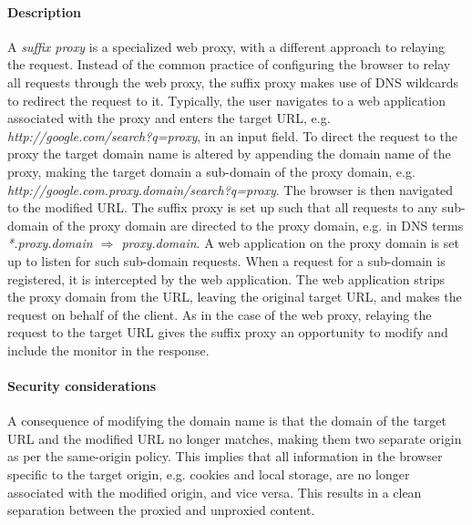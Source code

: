 \documentclass{llncs}
\begin{document}
\paragraph{Description}
A \emph{suffix proxy} is a specialized web proxy, with a different approach to relaying the request. 
Instead of the common practice of configuring the browser to relay all requests through the web proxy,
the suffix proxy makes use of DNS wildcards to redirect the request to it.
Typically, the user navigates to a 
web application associated with the proxy and enters the target URL, e.g. \emph{http://google.com/search?q=proxy}, in 
an input field. To direct the request to the proxy the target domain name is altered
by appending the domain name of the proxy, making the target domain a sub-domain of the proxy domain, e.g. \emph{http://google.com.proxy.domain/search?q=proxy}. 
The browser is then navigated to the modified URL.
The suffix proxy is set up such
that all requests to any sub-domain of the proxy domain are directed to the proxy domain, 
e.g. in DNS terms \emph{*.proxy.domain $\Rightarrow$ proxy.domain}. 
A web application on the proxy domain is set up to listen for such sub-domain requests.
When a request for a sub-domain is registered, it is intercepted by the web application.
The web application strips the proxy domain from the URL, leaving the original target URL, 
and makes the request on behalf of the client. As in the case of the web proxy, 
relaying the request to the target URL gives the suffix proxy an opportunity to modify and 
include the monitor in the response.








\paragraph{Security considerations}

A consequence of modifying the domain name is that the domain of the
target URL and the modified URL no longer matches, making them two 
separate origin as per the same-origin policy. This implies that all information in 
the browser specific to the target origin, e.g. cookies and local storage, 
are no longer associated with the modified origin, and vice versa. This results 
in a clean separation between the proxied and unproxied content.  
\end{document}
